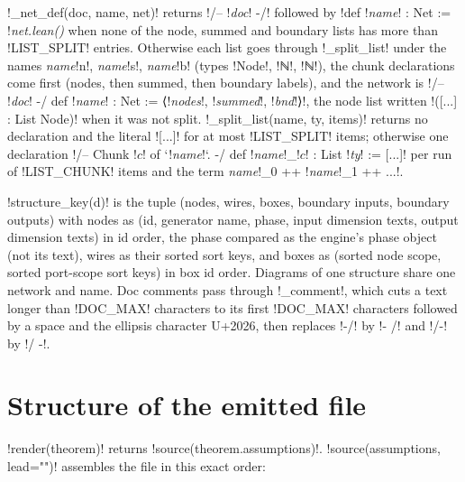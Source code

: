 {\py!_net_def(doc, name, net)! returns \code!/-- !\textit{doc}\code! -/! followed by
\code!def !\textit{name}\code! : Net := !\textit{net.lean()} when none of the node, summed and
boundary lists has more than \py!LIST_SPLIT! entries. Otherwise each list goes through
\py!_split_list! under the names \textit{name}\code!n!, \textit{name}\code!s!,
\textit{name}\code!b! (types \code!Node!, \code!ℕ!, \code!ℕ!), the chunk declarations come first
(nodes, then summed, then boundary labels), and the network is
\code!/-- !\textit{doc}\code! -/ def !\textit{name}\code! : Net := ⟨!\textit{nodes}\code!, !\textit{summed}\code!, !\textit{bnd}\code!⟩!,
the node list written \code!([...] : List Node)! when it was not split.
\py!_split_list(name, ty, items)! returns no declaration and the literal \code![...]! for at most
\py!LIST_SPLIT! items; otherwise one declaration
\code!/-- Chunk !$c$\code! of `!\textit{name}\code!`. -/ def !\textit{name}\code!_!$c$\code! : List !\textit{ty}\code! := [...]!
per run of \py!LIST_CHUNK! items and the term
\textit{name}\code!_0 ++ !\textit{name}\code!_1 ++ ...!.

\py!structure_key(d)! is the tuple (nodes, wires, boxes, boundary inputs, boundary outputs) with
nodes as (id, generator name, phase, input dimension texts, output dimension texts) in id
order, the phase compared as the engine's phase object (not its text), wires as their sorted
sort keys, and boxes as (sorted node scope, sorted port-scope sort keys) in box id order.
Diagrams of one structure share one network and name. Doc comments pass through
\py!_comment!, which cuts a text longer than \py!DOC_MAX! characters to its first
\py!DOC_MAX! characters followed by a space and the ellipsis character U+2026, then replaces \code!-/! by \code!- /! and
\code!/-! by \code!/ -!.

\section{Structure of the emitted file}\label{sec:lean-export-net-file}

\py!render(theorem)! returns \py!source(theorem.assumptions)!. \py!source(assumptions, lead="")!
assembles the file in this exact order:

}
